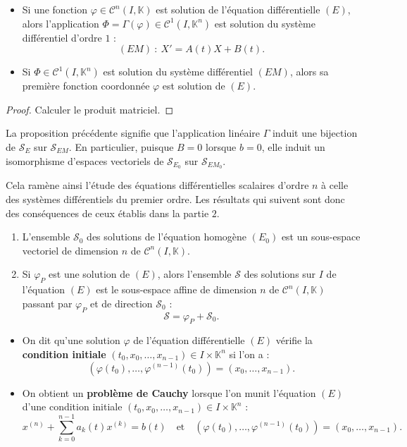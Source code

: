 \documentclass[french]{article}
\newcommand{\K}{\mathbb{K}}
\theoremstyle{plain}
\theoremstyle{definition}
\theoremstyle{remark}
\begin{document}
\begin{prop}%
	\begin{itemize}
		\item Si une fonction $\varphi\in\mathcal{C}^n(I,\K)$ est solution de l'équation différentielle $(E)$, alors l'application $\Phi=\Gamma(\varphi)\in\mathcal{C}^1(I,\K^n)$ est solution du système différentiel d'ordre $1$ :
		$$(EM)\ :\ X'=A(t)X+B(t).$$
		\item Si $\Phi\in\mathcal{C}^1(I,\K^n)$ est solution du système différentiel $(EM)$, alors sa première fonction coordonnée $\varphi$ est solution de $(E)$.
	\end{itemize}
\end{prop}
\begin{proof}
	Calculer le produit matriciel.
\end{proof}

La proposition précédente signifie que l'application linéaire $\Gamma$ induit une bijection de $\mathcal{S}_E$ sur $\mathcal{S}_{EM}$. En particulier, puisque $B=0$ lorsque $b=0$, elle induit un isomorphisme d'espaces vectoriels de $\mathcal{S}_{E_0}$ sur $\mathcal{S}_{EM_0}$.

Cela ramène ainsi l'étude des équations différentielles scalaires d'ordre $n$ à celle des systèmes différentiels du premier ordre. Les résultats qui suivent sont donc des conséquences de ceux établis dans la partie $2$.

\begin{prop}%
	\begin{enumerate}
		\item L'ensemble $\mathcal{S}_0$ des solutions de l'équation homogène $(E_0)$ est un sous-espace vectoriel de dimension $n$ de $\mathcal{C}^n(I,\K)$.
		\item Si $\varphi_P$ est une solution de $(E)$, alors l'ensemble $\mathcal{S}$ des solutions sur $I$ de l'équation $(E)$ est le sous-espace affine de dimension $n$ de $\mathcal{C}^n(I,\K)$ passant par $\varphi_P$ et de direction $\mathcal{S}_0$ :
		$$\mathcal{S}=\varphi_P+\mathcal{S}_0.$$
	\end{enumerate}
\end{prop}

\begin{dfn}
	\begin{itemize}
		\item On dit qu'une solution $\varphi$ de l'équation différentielle $(E)$ vérifie la \textbf{condition initiale} $(t_0,x_0,\ldots,x_{n-1})\in I\times\K^n$ si l'on a :
		$$(\varphi(t_0),\ldots,\varphi^{(n-1)}(t_0))=(x_0,\ldots,x_{n-1}).$$
		\item On obtient un \textbf{problème de Cauchy} lorsque l'on munit l'équation $(E)$ d'une condition initiale $(t_0,x_0,\ldots,x_{n-1})\in I\times\K^n$ :
		$$x^{(n)}+\sum_{k=0}^{n-1}a_k(t)x^{(k)}=b(t)\quad\text{et}\quad (\varphi(t_0),\ldots,\varphi^{(n-1)}(t_0))=(x_0,\ldots,x_{n-1}).$$
	\end{itemize}
\end{dfn}
\end{document}

